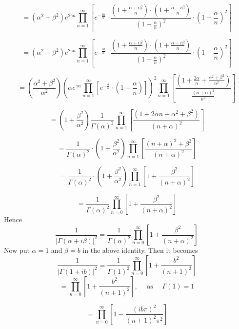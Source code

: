 $$
=\left(\alpha^{2}+\beta^{2}\right) e^{2 \gamma a} \prod_{n=1}^{\infty}\left[e^{-\frac{2 a}{n}} \cdot \frac{\left(1+\frac{\alpha+i \beta}{n}\right) \cdot\left(1+\frac{\alpha-i \beta}{n}\right)}{\left(1+\frac{\alpha}{n}\right)^{2}} \cdot\left(1+\frac{\alpha}{n}\right)^{2}\right]
$$

$$
=\left(\alpha^{2}+\beta^{2}\right) e^{2 \gamma a} \prod_{n=1}^{\infty}\left[e^{-\frac{2 a}{n}} \cdot \frac{\left(1+\frac{\alpha+i \beta}{n}\right) \cdot\left(1+\frac{\alpha-i \beta}{n}\right)}{\left(1+\frac{\alpha}{n}\right)^{2}} \cdot\left(1+\frac{\alpha}{n}\right)^{2}\right]
$$

$$
=\left(\frac{\alpha^{2}+\beta^{2}}{\alpha^{2}}\right)\left(\alpha e^{\gamma \alpha} \prod_{n=1}^{\infty}\left[e^{-\frac{a}{n}} \cdot\left(1+\frac{\alpha}{n}\right)\right]\right)^{2} \prod_{n=1}^{\infty}\left[\frac{\left(1+\frac{2 \alpha}{n}+\frac{\alpha^{2}+\beta^{2}}{n^{2}}\right)}{\frac{(n+\alpha)^{2}}{n^{2}}}\right]
$$


$$
=\left(1+\frac{\beta^{2}}{\alpha^{2}}\right) \frac{1}{\Gamma(\alpha)^{2}} \prod_{n=1}^{\infty}\left[\frac{\left(1+2 \alpha n+\alpha^{2}+\beta^{2}\right)}{(n+\alpha)^{2}}\right]
$$

$$
=\frac{1}{\Gamma(\alpha)^{2}} \cdot\left(1+\frac{\beta^{2}}{\alpha^{2}}\right) \prod_{n=1}^{\infty}\left[\frac{(n+\alpha)^{2}+\beta^{2}}{(n+\alpha)^{2}}\right]
$$

$$
=\frac{1}{\Gamma(\alpha)^{2}} \cdot\left(1+\frac{\beta^{2}}{\alpha^{2}}\right) \prod_{n=1}^{\infty}\left[1+\frac{\beta^{2}}{(n+\alpha)^{2}}\right]
$$

$$
=\frac{1}{\Gamma(\alpha)^{2}} \prod_{n=0}^{\infty}\left[1+\frac{\beta^{2}}{(n+\alpha)^{2}}\right]
$$
Hence
$$
\frac{1}{|\Gamma(\alpha+i \beta)|^{2}}=\frac{1}{\Gamma(\alpha)^{2}} \prod_{n=0}^{\infty}\left[1+\frac{\beta^{2}}{(n+\alpha)^{2}}\right]
$$
Now put $\alpha=1$ and $\beta=b$ in the above identity. Then it becomes
$$
\frac{1}{|\Gamma(1+i b)|^{2}}=\frac{1}{\Gamma(1)^{2}} \prod_{n=0}^{\infty}\left[1+\frac{b^{2}}{(n+1)^{2}}\right]
$$
$$
=\prod_{n=0}^{\infty}\left[1+\frac{b^{2}}{(n+1)^{2}}\right], \quad \text { as } \quad \Gamma(1)=1
$$

$$
=\prod_{n=0}^{\infty}\left[1-\frac{(i b \pi)^{2}}{(n+1)^{2} \pi^{2}}\right]
$$

